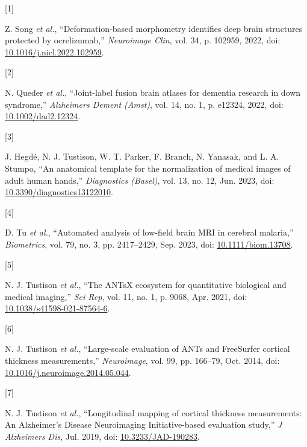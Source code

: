 \documentclass[
  11pt,
]{article}
\newlength{\cslhangindent}
\newlength{\csllabelwidth}
\newenvironment{CSLReferences}[2] %
 {%
  \setlength{\parindent}{0pt}
  \ifodd #1 \everypar{\setlength{\hangindent}{\cslhangindent}}\ignorespaces\fi
  \ifnum #2 > 0
  \setlength{\parskip}{#2\baselineskip}
  \fi
 }%
 {}
\newcommand{\CSLLeftMargin}[1]{\parbox[t]{\csllabelwidth}{#1}}
\newcommand{\CSLRightInline}[1]{\parbox[t]{\linewidth - \csllabelwidth}{#1}\break}
\begin{document}
\hypertarget{refs}{}
\begin{CSLReferences}{0}{0}
\leavevmode{}%
\CSLLeftMargin{{[}1{]} }
\CSLRightInline{Z. Song \emph{et al.}, {``Deformation-based morphometry
identifies deep brain structures protected by ocrelizumab,''}
\emph{Neuroimage Clin}, vol. 34, p. 102959, 2022, doi:
\href{https://doi.org/10.1016/j.nicl.2022.102959}{10.1016/j.nicl.2022.102959}.}

\leavevmode{}%
\CSLLeftMargin{{[}2{]} }
\CSLRightInline{N. Queder \emph{et al.}, {``Joint-label fusion brain
atlases for dementia research in down syndrome,''} \emph{Alzheimers
Dement (Amst)}, vol. 14, no. 1, p. e12324, 2022, doi:
\href{https://doi.org/10.1002/dad2.12324}{10.1002/dad2.12324}.}

\leavevmode{}%
\CSLLeftMargin{{[}3{]} }
\CSLRightInline{J. Hegdé, N. J. Tustison, W. T. Parker, F. Branch, N.
Yanasak, and L. A. Stumpo, {``An anatomical template for the
normalization of medical images of adult human hands,''}
\emph{Diagnostics (Basel)}, vol. 13, no. 12, Jun. 2023, doi:
\href{https://doi.org/10.3390/diagnostics13122010}{10.3390/diagnostics13122010}.}

\leavevmode{}%
\CSLLeftMargin{{[}4{]} }
\CSLRightInline{D. Tu \emph{et al.}, {``Automated analysis of low-field
brain MRI in cerebral malaria,''} \emph{Biometrics}, vol. 79, no. 3, pp.
2417--2429, Sep. 2023, doi:
\href{https://doi.org/10.1111/biom.13708}{10.1111/biom.13708}.}

\leavevmode{}%
\CSLLeftMargin{{[}5{]} }
\CSLRightInline{N. J. Tustison \emph{et al.}, {``The ANTsX ecosystem for
quantitative biological and medical imaging,''} \emph{Sci Rep}, vol. 11,
no. 1, p. 9068, Apr. 2021, doi:
\href{https://doi.org/10.1038/s41598-021-87564-6}{10.1038/s41598-021-87564-6}.}

\leavevmode{}%
\CSLLeftMargin{{[}6{]} }
\CSLRightInline{N. J. Tustison \emph{et al.}, {``Large-scale evaluation
of {ANTs} and {FreeSurfer} cortical thickness measurements,''}
\emph{Neuroimage}, vol. 99, pp. 166--79, Oct. 2014, doi:
\href{https://doi.org/10.1016/j.neuroimage.2014.05.044}{10.1016/j.neuroimage.2014.05.044}.}

\leavevmode{}%
\CSLLeftMargin{{[}7{]} }
\CSLRightInline{N. J. Tustison \emph{et al.}, {``Longitudinal mapping of
cortical thickness measurements: An {A}lzheimer's {D}isease
{N}euroimaging {I}nitiative-based evaluation study,''} \emph{J
Alzheimers Dis}, Jul. 2019, doi:
\href{https://doi.org/10.3233/JAD-190283}{10.3233/JAD-190283}.}


\end{CSLReferences}
\end{document}
